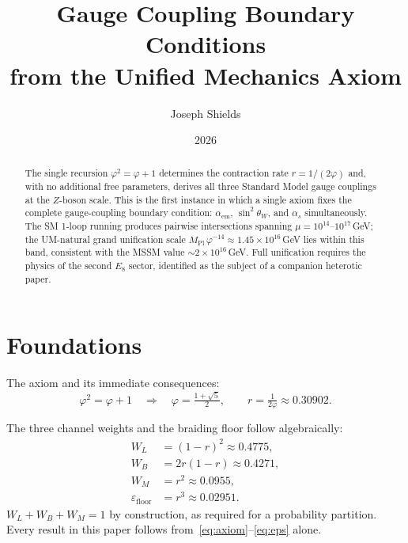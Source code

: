\documentclass[12pt]{article}
\title{\textbf{Gauge Coupling Boundary Conditions\\
from the Unified Mechanics Axiom}}
\author{Joseph Shields}
\date{2026}
\begin{document}
\maketitle

\begin{abstract}
The single recursion $\varphi^2 = \varphi + 1$ determines the contraction rate
$r = 1/(2\varphi)$ and, with no additional free parameters, derives all three
Standard Model gauge couplings at the $Z$-boson scale. This is the first
instance in which a single axiom fixes the complete gauge-coupling boundary
condition: $\alpha_{\text{em}}$, $\sin^2\!\theta_W$, and $\alpha_s$
simultaneously. The SM 1-loop running produces pairwise intersections
spanning $\mu = 10^{14}$--$10^{17}$\,GeV; the UM-natural grand unification
scale $M_{\text{Pl}}\,\varphi^{-14} \approx 1.45 \times 10^{16}$\,GeV lies
within this band, consistent with the MSSM value $\sim 2 \times 10^{16}$\,GeV.
Full unification requires the physics of the second $E_8$ sector, identified
as the subject of a companion heterotic paper.
\end{abstract}

\section{Foundations}

The axiom and its immediate consequences:
\begin{equation}
  \varphi^2 = \varphi + 1
  \quad\Rightarrow\quad
  \varphi = \tfrac{1+\sqrt{5}}{2},\qquad
  r = \tfrac{1}{2\varphi} \approx 0.30902.
  \label{eq:axiom}
\end{equation}

The three channel weights and the braiding floor follow algebraically:
\begin{align}
  W_L &= (1-r)^2         \approx 0.4775, \label{eq:wl}\\
  W_B &= 2r(1-r)         \approx 0.4271, \label{eq:wb}\\
  W_M &= r^2             \approx 0.0955, \label{eq:wm}\\
  \varepsilon_{\text{floor}} &= r^3 \approx 0.02951. \label{eq:eps}
\end{align}
$W_L + W_B + W_M = 1$ by construction, as required for a probability
partition. Every result in this paper follows from~\eqref{eq:axiom}--\eqref{eq:eps}
alone.
\end{document}
